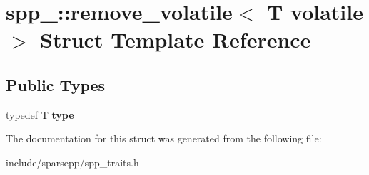 \hypertarget{structspp___1_1remove__volatile_3_01_t_01volatile_01_4}{}\section{spp\+\_\+\+:\+:remove\+\_\+volatile$<$ T volatile $>$ Struct Template Reference}
\label{structspp___1_1remove__volatile_3_01_t_01volatile_01_4}
\subsection*{Public Types}
\begin{DoxyCompactItemize}
\item 
typedef T {\bfseries type}\hypertarget{structspp___1_1remove__volatile_3_01_t_01volatile_01_4_ae4545eb6da1b26e9c26539c4303860b2}{}\label{structspp___1_1remove__volatile_3_01_t_01volatile_01_4_ae4545eb6da1b26e9c26539c4303860b2}

\end{DoxyCompactItemize}


The documentation for this struct was generated from the following file\+:\begin{DoxyCompactItemize}
\item 
include/sparsepp/spp\+\_\+traits.\+h\end{DoxyCompactItemize}
